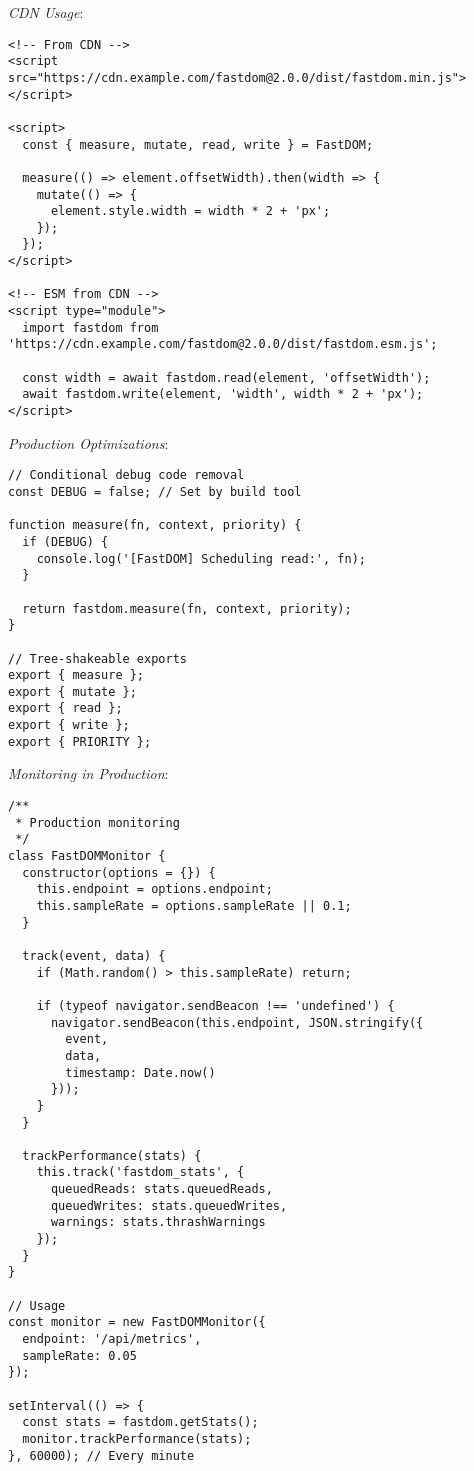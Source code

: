 \documentclass[11pt]{article}
\begin{document}
\emph{CDN Usage}:

\begin{verbatim}
<!-- From CDN -->
<script src="https://cdn.example.com/fastdom@2.0.0/dist/fastdom.min.js"></script>

<script>
  const { measure, mutate, read, write } = FastDOM;
  
  measure(() => element.offsetWidth).then(width => {
    mutate(() => {
      element.style.width = width * 2 + 'px';
    });
  });
</script>

<!-- ESM from CDN -->
<script type="module">
  import fastdom from 'https://cdn.example.com/fastdom@2.0.0/dist/fastdom.esm.js';
  
  const width = await fastdom.read(element, 'offsetWidth');
  await fastdom.write(element, 'width', width * 2 + 'px');
</script>
\end{verbatim}

\emph{Production Optimizations}:

\begin{verbatim}
// Conditional debug code removal
const DEBUG = false; // Set by build tool

function measure(fn, context, priority) {
  if (DEBUG) {
    console.log('[FastDOM] Scheduling read:', fn);
  }
  
  return fastdom.measure(fn, context, priority);
}

// Tree-shakeable exports
export { measure };
export { mutate };
export { read };
export { write };
export { PRIORITY };
\end{verbatim}

\emph{Monitoring in Production}:

\begin{verbatim}
/**
 * Production monitoring
 */
class FastDOMMonitor {
  constructor(options = {}) {
    this.endpoint = options.endpoint;
    this.sampleRate = options.sampleRate || 0.1;
  }
  
  track(event, data) {
    if (Math.random() > this.sampleRate) return;
    
    if (typeof navigator.sendBeacon !== 'undefined') {
      navigator.sendBeacon(this.endpoint, JSON.stringify({
        event,
        data,
        timestamp: Date.now()
      }));
    }
  }
  
  trackPerformance(stats) {
    this.track('fastdom_stats', {
      queuedReads: stats.queuedReads,
      queuedWrites: stats.queuedWrites,
      warnings: stats.thrashWarnings
    });
  }
}

// Usage
const monitor = new FastDOMMonitor({
  endpoint: '/api/metrics',
  sampleRate: 0.05
});

setInterval(() => {
  const stats = fastdom.getStats();
  monitor.trackPerformance(stats);
}, 60000); // Every minute
\end{verbatim}
\end{document}
